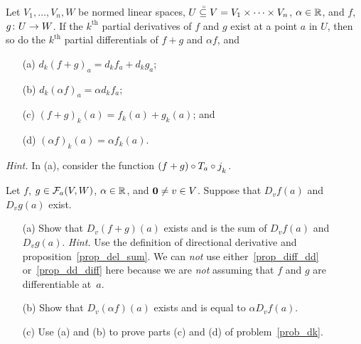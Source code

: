 \begin{prob}\label{prob_dk}  Let $V_1,\dots,V_n,W$ be normed linear spaces, $U\overset{\thickspace{}_\circ}{\subseteq}V = V_1 \times
\dots \times V_n$, $\alpha \in \mathbb{R}$, and $f$, $g\colon U \rightarrow W$. If the $k^{\text {th}}$
partial derivatives of $f$ and $g$ exist at a point $a$ in $U$, then so do the $k^{\text
{th}}$ partial differentials of $f+g$ and $\alpha f$, and
 \begin{enumerate}
  \item[(a)] $d_k(f + g)_a = d_kf_a + d_kg_a$;
  \item[(b)] $d_k(\alpha f)_a = \alpha d_kf_a$;
  \item[(c)] $(f + g)_k(a) = f_k(a) + g_k(a)$; and
  \item[(d)] $(\alpha f)_k(a) = \alpha f_k(a)$.
 \end{enumerate}
\emph{Hint.}  In (a), consider the function $(f + g) \circ T_a \circ j_{{}_{{\scriptstyle{k}}}}$.
\end{prob}

\begin{prob} Let $f$, $g \in \mathcal{F}_a(V,W)$, $\alpha \in \mathbb{R}$, and $\mathbf{0} \ne v \in V$.  Suppose
that $D_vf(a)$ and $D_vg(a)$ exist.
 \begin{enumerate}
  \item[(a)] Show that $D_v(f + g)(a)$ exists and is the sum of $D_vf(a)$ and $D_vg(a)$.
\emph{Hint.}  Use the definition of directional derivative and proposition~\ref{prop_del_sum}.
We can \emph{not} use either~\ref{prop_diff_dd} or~\ref{prop_dd_diff} here because we are
\emph{not} assuming that $f$ and $g$ are differentiable at~$a$.
  \item[(b)] Show that $D_v(\alpha f)(a)$ exists and is equal to $\alpha D_vf(a)$.
  \item[(c)] Use (a) and (b) to prove parts (c) and (d) of problem~\ref{prob_dk}.
 \end{enumerate}
\end{prob}








